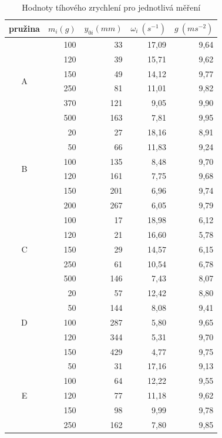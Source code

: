 \documentclass{article}
\begin{document}
\begin{table}[htbp]
\begin{center}
\begin{tabular}{|c||r|r|r|r|}
\hline
pružina & \multicolumn{1}{c|}{$m_{i} (g)$} & \multicolumn{1}{c|}{$y_{0i} (mm)$} & \multicolumn{1}{c|}{$\omega _{i} ~(s^{-1})$} & \multicolumn{1}{c|}{$ g ~(ms^{-2})   $} \\ \hline \hline
\multirow{6}{*}{A} & 100 & 33 & 17,09 & 9,64 \\ 
 & 120 & 39 & 15,71 & 9,62 \\ 
 & 150 & 49 & 14,12 & 9,77 \\ 
 & 250 & 81 & 11,01 & 9,82 \\ 
 & 370 & 121 & 9,05 & 9,90 \\ 
 & 500 & 163 & 7,81 & 9,95 \\ \hline
\multirow{6}{*}{B} & 20 & 27 & 18,16 & 8,91 \\
 & 50 & 66 & 11,83 & 9,24 \\
 & 100 & 135 & 8,48 & 9,70 \\
 & 120 & 161 & 7,75 & 9,68 \\ 
 & 150 & 201 & 6,96 & 9,74 \\ 
 & 200 & 267 & 6,05 & 9,79 \\ \hline
\multirow{5}{*}{C} & 100 & 17 & 18,98 & 6,12 \\
 & 120 & 21 & 16,60 & 5,78 \\
 & 150 & 29 & 14,57 & 6,15 \\ 
 & 250 & 61 & 10,54 & 6,78 \\ 
 & 500 & 146 & 7,43 & 8,07 \\ \hline
\multirow{5}{*}{D} & 20 & 57 & 12,42 & 8,80 \\ 
 & 50 & 144 & 8,08 & 9,41 \\
 & 100 & 287 & 5,80 & 9,65 \\ 
 & 120 & 344 & 5,31 & 9,70 \\
 & 150 & 429 & 4,77 & 9,75 \\ \hline
\multirow{5}{*}{E} & 50 & 31 & 17,16 & 9,13 \\ 
 & 100 & 64 & 12,22 & 9,55 \\ 
 & 120 & 77 & 11,18 & 9,62 \\ 
 & 150 & 98 & 9,99 & 9,78 \\ 
 & 250 & 162 & 7,80 & 9,85 \\ \hline
\end{tabular}
\caption{Hodnoty tíhového zrychlení pro jednotlivá měření}
\label{ttiha}
\end{center}

\end{table}
\end{document}
